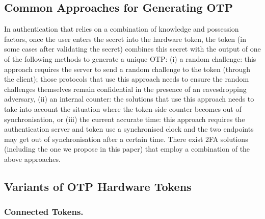 \subsection{Common Approaches for Generating OTP}

In authentication that relies on a combination of knowledge and possession factors, once the user enters the secret into the hardware token, the token (in some cases after validating the secret) combines this secret with the output of one of the following methods to generate a unique OTP:  (i) a random challenge: this approach requires the server to send a random challenge to the token (through the client); those protocols that use this approach needs to ensure the random challenges themselves remain confidential in the presence of an eavesdropping adversary,  (ii) an internal counter:  the solutions that use this approach needs to take into account the situation where the token-side counter becomes out of synchronisation, or (iii) the current accurate time: this approach requires the authentication server and token use a synchronised clock and the two endpoints may get out of synchronisation after a certain time. There exist 2FA solutions (including the one we propose in this paper) that employ a combination of the above approaches. 
\subsection{Variants of OTP Hardware Tokens}

\subsubsection{Connected Tokens.}






